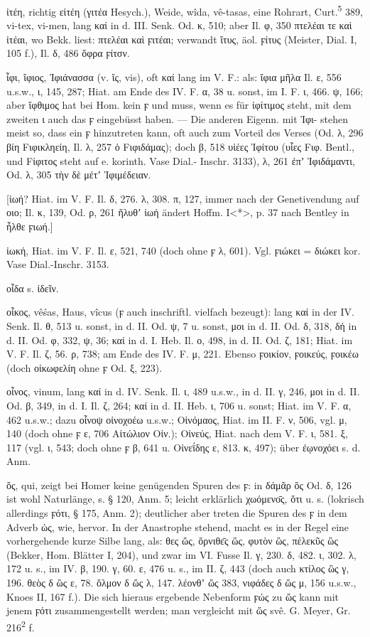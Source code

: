 ἰτέη, richtig εἰτέη (γιτέα Hesych.), Weide,  wîda,  vê-tasas, eine Rohrart, Curt.\textsuperscript{5} 389,  vi-tex, vi-men, lang καί in d. III. Senk. Od. κ, 510; aber Il. φ, 350 πτελέαι τε καὶ ἰτέαι, wo Bekk. liest: πτελέαι καὶ ϝιτέαι; verwandt ἴτυς, äol. ϝίτυς (Meister, Dial. I, 105 f.), Il. δ, 486 ὄφρα ϝίτσν.

ἶφι, ἴφιος, Ἰφιάνασσα (v. ἴς,  vis), oft καί lang im V. F.: als: ἴφια μῆλα Il. ε, 556 u.s.w., ι, 145, 287; Hiat. am Ende des IV. F. α, 38 u. sonst, im I. F. ι, 466. ψ, 166; aber ἴφθιμος hat bei Hom. kein ϝ und muss, wenn es für ἰφίτιμος steht, mit dem zweiten ι auch das ϝ eingebüsst haben. — Die anderen Eigenn. mit Ἰφι- stehen meist so, dass ein ϝ hinzutreten kann, oft auch zum Vorteil des Verses (Od. λ, 296 βίη Fιφικληείη, Il. λ, 257 ὁ Fιφιδάμας); doch β, 518 υἱέες Ἰφίτου (υἷες Fιφ. Bentl., und Fίφιτος steht auf e. korinth. Vase Dial.- Inschr. 3133), λ, 261 ἐπʼ Ἰφιδάμαντι, Od. λ, 305 τὴν δὲ μέτʼ Ἰφιμέδειαν.

[ἰωή? Hiat. im V. F. Il. δ, 276. λ, 308. π, 127, immer nach der Genetivendung auf οιο; Il. κ, 139, Od. ρ, 261 ἤλυθʼ ἰωή ändert Hoffm. I<*>, p. 37 nach Bentley in ἦλθε ϝιωή.]

ἰωκή, Hiat. im V. F. Il. ε, 521, 740 (doch ohne ϝ λ, 601). Vgl. ϝιώκει = διώκει kor. Vase Dial.-Inschr. 3153.

οἶδα s. ἰδεῖν.

οἶκος,  vêśas, Haus,  vîcus (ϝ auch inschriftl. vielfach bezeugt): lang καί in der IV. Senk. Il. θ, 513 u. sonst, in d. II. Od. ψ, 7 u. sonst, μοι in d. II. Od. δ, 318, δή in d. II. Od. φ, 332, ψ, 36; καί in d. I. Heb. Il. ο, 498, in d. II. Od. ζ, 181; Hiat. im V. F. Il. ζ, 56. ρ, 738; am Ende des IV. F. μ, 221. Ebenso ϝοικίον, ϝοικεύς, ϝοικέω (doch οἰκωφελίη ohne ϝ Od. ξ, 223).

οἶνος, vinum, lang καί in d. IV. Senk. Il. ι, 489 u.s.w., in d. II. γ, 246, μοι in d. II. Od. β, 349, in d. I. Il. ζ, 264; καί in d. II. Heb. ι, 706 u. sonst; Hiat. im V. F. α, 462 u.s.w.; dazu οἶνοψ οἰνοχοέω u.s.w.; Οἰνόμαος, Hiat. im II. F. ν, 506, vgl. μ, 140 (doch ohne ϝ ε, 706 Αἰτώλιον Οἰν.); Οἰνεύς, Hiat. nach dem V. F. ι, 581. ξ, 117 (vgl. ι, 543; doch ohne ϝ β, 641 u. Οἰνεΐδης ε, 813. κ, 497); über ἐῳνοχόει s. d. Anm.

ὅς, qui, zeigt bei Homer keine genügenden Spuren des ϝ: in δάμᾶρ ὅς Od. δ, 126 ist wohl Naturlänge, s. § 120, Anm. 5; leicht erklärlich χωόμενο̄ς, ὅτι u. s. (lokrisch allerdings ϝότι, § 175, Anm. 2); deutlicher aber treten die Spuren des ϝ in dem Adverb ὡς, wie, hervor. In der Anastrophe stehend, macht es in der Regel eine vorhergehende kurze Silbe lang, als: θες ὥς, ὄρνιθε̄ς ὥς, φυτὸν ὣς, πέλεκῦς ὣς (Bekker, Hom. Blätter I, 204), und zwar im VI. Fusse Il. γ, 230. δ, 482. ι, 302. λ, 172 u. s., im IV. β, 190. γ, 60. ε, 476 u. s., im II. ζ, 443 (doch auch κτίλος ὣς γ, 196. θεὸς δ ὣς ε, 78. ὅλμον δ ὥς λ, 147. λέονθʼ ὥς 383, νιφάδες δ ὥς μ, 156 u.s.w., Knoes II, 167 f.). Die sich hieraus ergebende Nebenform ϝώς zu ὥς kann mit jenem ϝότι zusammengestellt werden; man vergleicht mit ὥς  svê. G. Meyer, Gr. 216\textsuperscript{2} f.

